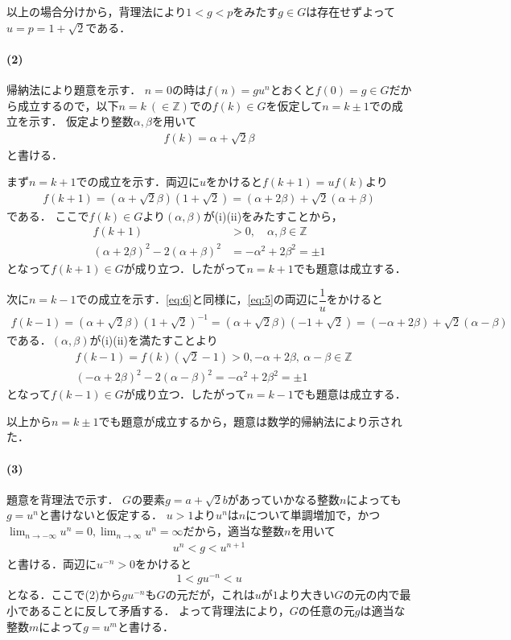 \documentclass[../../main.tex]{subfiles}
\begin{document}
以上の場合分けから，背理法により$1<g<p$をみたす$g\in G$は存在せずよって$u=p=1+\sqrt{2}$である．

\paragraph{(2)}
帰納法により題意を示す．
$n=0$の時は$f(n)=gu^n$とおくと$f(0)=g\in G$だから成立するので，以下$n=k\ (\in\mathbb{Z})$での$f(k)\in G$を仮定して$n=k\pm1$での成立を示す．
仮定より整数$\alpha,\beta$を用いて
\begin{align}
  f(k)=\alpha+\sqrt{2}\beta \label{eq:5}
\end{align}
と書ける．

まず$n=k+1$での成立を示す．両辺に$u$をかけると$f(k+1)=uf(k)$より
\begin{align}
  f(k+1)=(\alpha+\sqrt{2}\beta)(1+\sqrt{2})=(\alpha+2\beta)+\sqrt{2}(\alpha+\beta) \label{eq:6}
\end{align}
である．
ここで$f(k)\in G$より$(\alpha,\beta)$が(i)(ii)をみたすことから，
\begin{align}
  f(k+1)&>0,\quad \alpha,\beta\in\mathbb{Z} \\
  (\alpha+2\beta)^2-2(\alpha+\beta)^2&=-\alpha^2+2\beta^2=\pm1
\end{align}
となって$f(k+1)\in G$が成り立つ．したがって$n=k+1$でも題意は成立する．

次に$n=k-1$での成立を示す．\cref{eq:6}と同様に，\cref{eq:5}の両辺に$\dfrac{1}{u}$をかけると
\begin{align}
  f(k-1)=(\alpha+\sqrt{2}\beta)(1+\sqrt{2})^{-1}=(\alpha+\sqrt{2}\beta)(-1+\sqrt{2})=(-\alpha+2\beta)+\sqrt{2}(\alpha-\beta)
\end{align}
である．$(\alpha,\beta)$が(i)(ii)を満たすことより
\begin{align}
  & f(k-1)=f(k)(\sqrt{2}-1)>0, -\alpha+2\beta,\ \alpha-\beta\in\mathbb{Z} \\
  & (-\alpha+2\beta)^2-2(\alpha-\beta)^2=-\alpha^2+2\beta^2=\pm1
\end{align}
となって$f(k-1)\in G$が成り立つ．したがって$n=k-1$でも題意は成立する．

以上から$n=k\pm1$でも題意が成立するから，題意は数学的帰納法により示された．

\paragraph{(3)}
題意を背理法で示す．
$G$の要素$g=a+\sqrt{2}b$があっていかなる整数$n$によっても $g = u^n$と書けないと仮定する．
$u>1$より$u^{n}$は$n$について単調増加で，かつ$\lim_{n\to-\infty}u^n=0, \lim_{n\to\infty}u^n=\infty$だから，適当な整数$n$を用いて
\begin{align}
  u^n < g < u^{n+1}
\end{align}
と書ける．両辺に$u^{-n}>0$をかけると
\begin{align}
  1 < gu^{-n} < u
\end{align}
となる．ここで(2)から$gu^{-n}$も$G$の元だが，これは$u$が$1$より大きい$G$の元の内で最小であることに反して矛盾する．
よって背理法により，$G$の任意の元$g$は適当な整数$m$によって$g=u^{m}$と書ける．

\newpage
\end{document}
